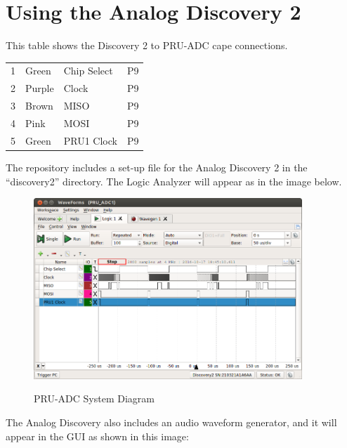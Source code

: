 \chapter{Using the Analog Discovery 2}



This table shows the Discovery 2 to PRU-ADC cape connections.


	\begin{tabular}{llll}
		\toprule
	1	& Green & Chip Select & P9 \\ 
	2	& Purple & Clock & P9 \\ 
	3	& Brown & MISO & P9 \\ 
	4	& Pink &  MOSI & P9 \\ 
	5	& Green & PRU1 Clock & P9
	\end{tabular}
	
	The repository includes a set-up file for the Analog Discovery 2 in the ``discovery2'' directory.  The Logic Analyzer will appear as in the image below.
	
	\begin{figure}[h]
		\centering
		\includegraphics[width=0.9\textwidth]{photos/discovery2_logic}
		\centering\bfseries
		\caption{PRU-ADC System Diagram}
	\end{figure}
	
	The Analog Discovery also includes an audio waveform generator, and it will appear in the GUI as shown in this image:
	
